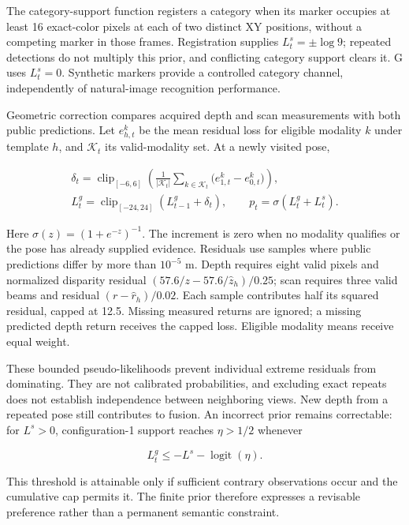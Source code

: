 \documentclass[11pt,a4paper]{article}
\begin{document}
The category-support function registers a category when its marker occupies at least 16 exact-color pixels at each of two distinct XY positions, without a competing marker in those frames. Registration supplies \(L_t^s=\pm\log9\); repeated detections do not multiply this prior, and conflicting category support clears it. G uses \(L_t^s=0\). Synthetic markers provide a controlled category channel, independently of natural-image recognition performance.

Geometric correction compares acquired depth and scan measurements with both public predictions. Let \(e_{h,t}^{k}\) be the mean residual loss for eligible modality \(k\) under template \(h\), and \(\mathcal K_t\) its valid-modality set. At a newly visited pose,

\[
\begin{aligned}
\delta_t=\operatorname{clip}_{[-6,6]}
\left(\frac{1}{|\mathcal K_t|}\sum_{k\in\mathcal K_t}
\bigl(e_{1,t}^{k}-e_{0,t}^{k}\bigr)\right),\\
L_t^g=\operatorname{clip}_{[-24,24]}(L_{t-1}^g+\delta_t),\qquad
p_t=\sigma(L_t^g+L_t^s).
\end{aligned}
\]

Here \(\sigma(z)=(1+e^{-z})^{-1}\). The increment is zero when no modality qualifies or the pose has already supplied evidence. Residuals use samples where public predictions differ by more than \(10^{-5}\) m. Depth requires eight valid pixels and normalized disparity residual \((57.6/z-57.6/\widehat z_h)/0.25\); scan requires three valid beams and residual \((r-\widehat r_h)/0.02\). Each sample contributes half its squared residual, capped at 12.5. Missing measured returns are ignored; a missing predicted depth return receives the capped loss. Eligible modality means receive equal weight.

These bounded pseudo-likelihoods prevent individual extreme residuals from dominating. They are not calibrated probabilities, and excluding exact repeats does not establish independence between neighboring views. New depth from a repeated pose still contributes to fusion. An incorrect prior remains correctable: for \(L^s>0\), configuration-1 support reaches \(\eta>1/2\) whenever

\[
L_t^g\le-L^s-\operatorname{logit}(\eta).
\]

This threshold is attainable only if sufficient contrary observations occur and the cumulative cap permits it. The finite prior therefore expresses a revisable preference rather than a permanent semantic constraint.
\end{document}
